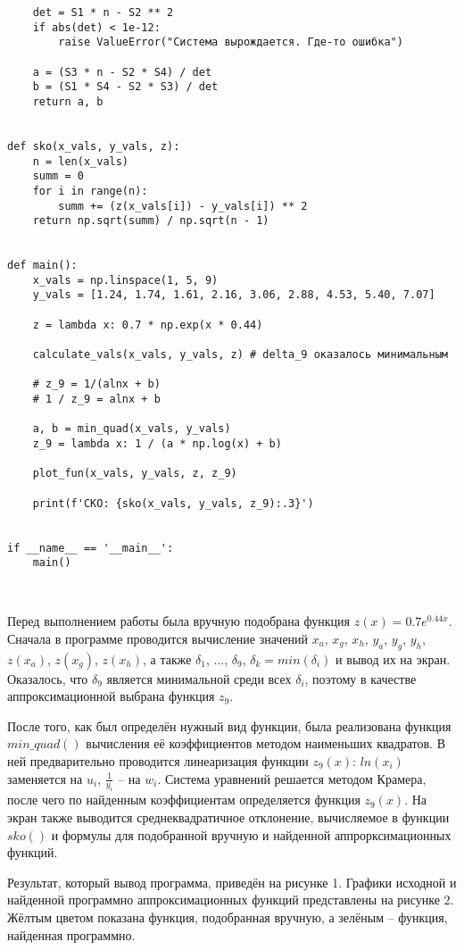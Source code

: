 \documentclass[a4paper, 14pt]{extarticle}
\begin{document}
\begin{verbatim}
	det = S1 * n - S2 ** 2
	if abs(det) < 1e-12:
		raise ValueError("Система вырождается. Где-то ошибка")
	
	a = (S3 * n - S2 * S4) / det
	b = (S1 * S4 - S2 * S3) / det
	return a, b


def sko(x_vals, y_vals, z):
	n = len(x_vals)
	summ = 0
	for i in range(n):
		summ += (z(x_vals[i]) - y_vals[i]) ** 2
	return np.sqrt(summ) / np.sqrt(n - 1)


def main():
	x_vals = np.linspace(1, 5, 9)
	y_vals = [1.24, 1.74, 1.61, 2.16, 3.06, 2.88, 4.53, 5.40, 7.07]
	
	z = lambda x: 0.7 * np.exp(x * 0.44)
	
	calculate_vals(x_vals, y_vals, z) # delta_9 оказалось минимальным
	
	# z_9 = 1/(alnx + b)
	# 1 / z_9 = alnx + b
	
	a, b = min_quad(x_vals, y_vals)
	z_9 = lambda x: 1 / (a * np.log(x) + b)
	
	plot_fun(x_vals, y_vals, z, z_9)
	
	print(f'СКО: {sko(x_vals, y_vals, z_9):.3}')


if __name__ == '__main__':
	main()



\end{verbatim}

Перед выполнением работы была вручную подобрана функция $z(x) = 0.7 e^{0.44x}$.
Сначала в программе проводится вычисление значений $x_a$, $x_g$, $x_h$, $y_a$, $y_g$, $y_h$, $z(x_a)$, $z(x_g)$, $z(x_h)$, 
а также $\delta_1$, ..., $\delta_9$, $\delta_k = min(\delta_i)$ и вывод их на экран. Оказалось, что 
$\delta_9$ является минимальной среди всех $\delta_i$, поэтому в качестве аппроксимационной выбрана функция $z_9$.

После того, как был определён нужный вид функции, была реализована функция $min\_quad()$ вычисления её коэффициентов 
методом наименьших квадратов. В ней предварительно проводится линеаризация функции 
$z_9(x)$: $ln(x_i)$ заменяется на $u_i$, $\frac{1}{y_i}$ -- на $w_i$. Система уравнений решается методом Крамера, 
после чего по найденным коэффициентам определяется функция $z_9(x)$. На экран также выводится среднеквадратичное отклонение, 
вычисляемое в функции $sko()$ и формулы для подобранной вручную и найденной аппрорксимационных функций.

Результат, который вывод программа, приведён на рисунке 1. Графики исходной и найденной программно аппроксимационных функций 
представлены на рисунке 2. Жёлтым цветом показана функция, подобранная вручную, а 
зелёным -- функция, найденная программно.
\end{document}
